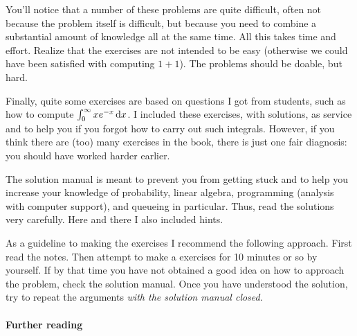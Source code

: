 You'll notice that a number of these problems are quite difficult, often not because the problem itself is difficult, but because you need to combine a substantial amount of knowledge all at the same time.
All this takes time and effort.
Realize that the exercises are not intended to be easy (otherwise we could have been satisfied with computing $1+1$).
The problems should be doable, but hard.

Finally, quite some exercises are based on questions I got from students, such as how to compute $\int_0^\infty x e^{-x} \,\text{d}x$.
I included these exercises, with solutions, as service and to help you if you forgot how to carry out such integrals.
However, if you think there are (too) many exercises in the book, there is just one fair diagnosis: you should have worked harder earlier.

The solution manual is meant to prevent you from getting stuck and to help you increase your knowledge of probability, linear algebra, programming (analysis with computer support), and queueing in particular.
Thus, read the solutions very carefully.
Here and there I also included hints.

As a guideline to making the exercises I recommend the following approach.
First read the notes.
Then attempt to make a exercises for 10 minutes or so by yourself.
If by that time you have not obtained a good idea on how to approach the problem, check the solution manual.
Once you have understood the solution, try to repeat the arguments \emph{with the solution manual closed}.



\paragraph{Further reading}

